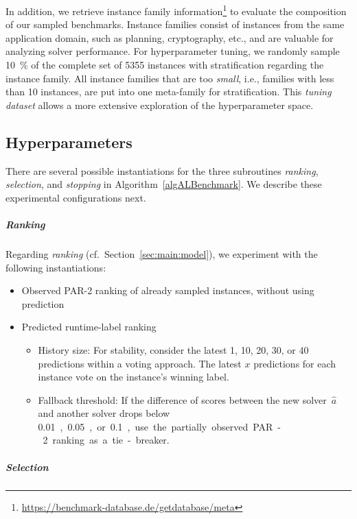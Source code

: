 \documentclass[sn-basic, Numbered]{sn-jnl} %
\begin{document}
In addition, we retrieve instance family information\footnote{\url{https://benchmark-database.de/getdatabase/meta}} to evaluate the composition of our sampled benchmarks.
Instance families consist of instances from the same application domain, such as planning, cryptography, etc., and are valuable for analyzing solver performance.
For hyperparameter tuning, we randomly sample \SI{10}{\%} of the complete set of 5355 instances with stratification regarding the instance family.
All instance families that are too \emph{small}, i.e., families with less than 10 instances, are put into one meta-family for stratification.
This \emph{tuning dataset} allows a more extensive exploration of the hyperparameter space.

\subsection{Hyperparameters}
\label{sec:exdesign:hyper}

There are several possible instantiations for the three subroutines \emph{ranking}, \emph{selection}, and \emph{stopping} in Algorithm~\ref{algALBenchmark}.
We describe these experimental configurations next.

\subparagraph{Ranking}

Regarding \emph{ranking} (cf.~Section~\ref{sec:main:model}), we experiment with the following instantiations:

\begin{itemize}\setlength{\itemsep}{1pt}
  \item Observed PAR-2 ranking of already sampled instances, without using prediction
  \item Predicted runtime-label ranking
  \vspace*{-1ex}
  \begin{itemize}\setlength{\itemsep}{1pt}
    \item
    History size: For stability, consider the latest 1, 10, 20, 30, or 40 predictions within a voting approach.
    The latest $x$ predictions for each instance vote on the instance's winning label.
    \item
    Fallback threshold: If the difference of scores between the new solver~$\hat{a}$ and another solver drops below \SI{0.01}, \SI{0.05}, or \SI{0.1}, use the partially observed PAR-2 ranking as a tie-breaker.
  \end{itemize}
\end{itemize}

\subparagraph{Selection}
\end{document}
